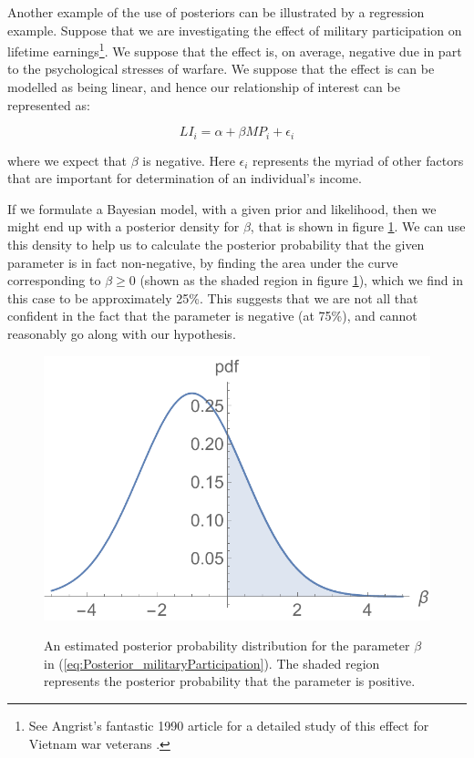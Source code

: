 \documentclass[11pt,fullpage]{book}
\begin{document}
Another example of the use of posteriors can be illustrated by a regression example. Suppose that we are investigating the effect of military participation on lifetime earnings\footnote{See Angrist's fantastic 1990 article for a detailed study of this effect for Vietnam war veterans \cite{angrist1990lifetime}.}. We suppose that the effect is, on average, negative due in part to the psychological stresses of warfare. We suppose that the effect is can be modelled as being linear, and hence our relationship of interest can be represented as:

\begin{equation}\label{eq:Posterior_militaryParticipation}
LI_i = \alpha + \beta MP_i + \epsilon_i
\end{equation}

where we expect that $\beta$ is negative. Here $\epsilon_i$ represents the myriad of other factors that are important for determination of an individual's income.

If we formulate a Bayesian model, with a given prior and likelihood, then we might end up with a posterior density for $\beta$, that is shown in figure \ref{fig:Posterior_regressionMilitaryParticipation}. We can use this density to help us to calculate the posterior probability that the given parameter is in fact non-negative, by finding the area under the curve corresponding to $\beta\geq 0$ (shown as the shaded region in figure \ref{fig:Posterior_regressionMilitaryParticipation}), which we find in this case to be approximately 25\%. This suggests that we are not all that confident in the fact that the parameter is negative (at 75\%), and cannot reasonably go along with our hypothesis.

\begin{figure}
\centering
\scalebox{0.5} 
{\includegraphics{Posterior_regressionMilitaryParticipation.pdf}}
\caption{An estimated posterior probability distribution for the parameter $\beta$ in (\ref{eq:Posterior_militaryParticipation}). The shaded region represents the posterior probability that the parameter is positive.}\label{fig:Posterior_regressionMilitaryParticipation}
\end{figure}
\end{document}
